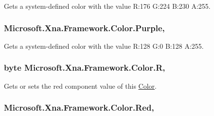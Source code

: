 Gets a system-\/defined color with the value R\+:176 G\+:224 B\+:230 A\+:255.

\hypertarget{struct_microsoft_1_1_xna_1_1_framework_1_1_color_a689bbaa13f7e43b7daca8a39233d4034}{}
\subsubsection[{Purple}]{ Microsoft.\+Xna.\+Framework.\+Color.\+Purple\hspace{0.3cm}{\ttfamily [static]}, {\ttfamily [get]}}\label{struct_microsoft_1_1_xna_1_1_framework_1_1_color_a689bbaa13f7e43b7daca8a39233d4034}


Gets a system-\/defined color with the value R\+:128 G\+:0 B\+:128 A\+:255.

\hypertarget{struct_microsoft_1_1_xna_1_1_framework_1_1_color_a9fb9559a789d7b5c4bfb9415e5f13457}{}
\subsubsection[{R}]{\setlength{\rightskip}{0pt plus 5cm}byte Microsoft.\+Xna.\+Framework.\+Color.\+R\hspace{0.3cm}{\ttfamily [get]}, {\ttfamily [set]}}\label{struct_microsoft_1_1_xna_1_1_framework_1_1_color_a9fb9559a789d7b5c4bfb9415e5f13457}


Gets or sets the red component value of this \hyperlink{struct_microsoft_1_1_xna_1_1_framework_1_1_color}{Color}.

\hypertarget{struct_microsoft_1_1_xna_1_1_framework_1_1_color_aeba4f4f8f29105c08df992c7de2e5466}{}
\subsubsection[{Red}]{ Microsoft.\+Xna.\+Framework.\+Color.\+Red\hspace{0.3cm}{\ttfamily [static]}, {\ttfamily [get]}}\label{struct_microsoft_1_1_xna_1_1_framework_1_1_color_aeba4f4f8f29105c08df992c7de2e5466}


